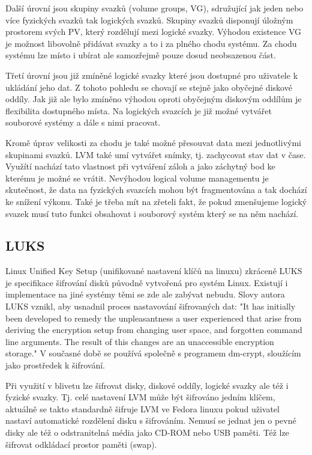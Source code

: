 \documentclass[color,table,oneside,nolot,nolof]{fithesis}
\begin{document}
	Další úrovní jsou skupiny svazků (volume groups, VG), sdružující jak jeden nebo více fyzických svazků tak logických svazků. Skupiny svazků disponují úložným prostorem svých PV, který 
  rozdělují mezi logické svazky. Výhodou existence VG je možnost libovolně přidávat svazky a to i za plného chodu systému. Za chodu systému lze místo i ubírat ale samozřejmě
	pouze dosud neobsazenou část. 

	Třetí úrovní jsou již zmíněné logické svazky které jsou dostupné pro uživatele k ukládání jeho dat. Z tohoto pohledu se chovají se stejně jako obyčejné diskové oddíly. Jak již ale
	bylo zmíněno výhodou oproti obyčejným diskovým oddílům je flexibilita dostupného místa. Na logických svazcích je již možné vytvářet souborové systémy a dále s nimi pracovat.

	Kromě úprav velikosti za chodu je také možné přesouvat data mezi jednotlivými skupinami svazků. LVM také umí vytvářet snímky, tj. zachycovat stav dat v čase. Využítí nachází tato vlastnost
	při vytváření záloh a jako záchytný bod ke kterému je možné se vrátit. Nevýhodou logical volume managementu je skutečnost, že data na fyzických svazcích mohou být fragmentována a tak
	dochází ke snížení výkonu. Také je třeba mít na zřeteli fakt, že pokud zmenšujeme logický svazek musí tuto funkci obsahovat i souborový systém který se na něm nachází.

\subsection{LUKS}
	Linux Unified Key Setup (unifikované nastavení klíčů na linuxu) zkráceně LUKS je specifikace šifrování disků původně vytvořená pro systém Linux. Existují i implementace na jiné systémy
	těmi se zde ale zabývat nebudu. Slovy autora LUKS vznikl, aby usnadnil proces nastavování šifrovaných dat: "It has initially been developed to remedy the unpleasantness a user 
	experienced that arise from deriving the encryption setup from changing user space, and forgotten command line arguments. The result of this changes are an unaccessible encryption
	storage."\cite{on-disk-format} V současné době se používá společně s programem dm-crypt, sloužícím jako prostředek k šifrování.

	Při využití v blivetu lze šifrovat disky, diskové oddíly, logické svazky ale též i fyzické svazky. Tj. celé nastavení LVM může být šifrováno jedním klíčem, aktuálně se takto 
	standardně šifruje LVM ve Fedora linuxu pokud uživatel nastaví automatické rozdělení disku s šifrováním. Nemusí se jednat jen o pevné disky ale též o odstranitelná média jako
	CD-ROM nebo USB paměti. Též lze šifrovat odkládací prostor paměti (swap).
\end{document}
